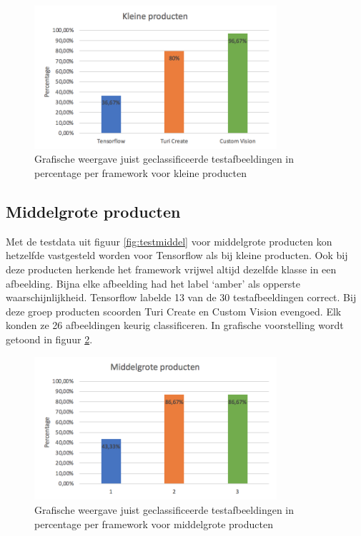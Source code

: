 \begin{figure}[ht!]
  \centering
      \includegraphics[width=0.8\textwidth]{img/grafiekkleineproducten.png}
  \caption{Grafische weergave juist geclassificeerde testafbeeldingen in percentage per framework voor kleine producten}
  \label{fig:grafiekkleineproducten}
\end{figure}

\subsection{Middelgrote producten}
\label{ssec:Middelgrote producten}

Met de testdata uit figuur \ref{fig:testmiddel} voor middelgrote producten kon hetzelfde vastgesteld worden voor Tensorflow als bij kleine producten.  Ook bij deze producten herkende het framework vrijwel altijd dezelfde klasse in een afbeelding. Bijna elke afbeelding had het label ‘amber’ als opperste waarschijnlijkheid. Tensorflow labelde 13 van de 30 testafbeeldingen correct. Bij deze groep producten scoorden Turi Create en Custom Vision evengoed. Elk konden ze 26 afbeeldingen keurig classificeren.  In grafische voorstelling wordt getoond in figuur \ref{fig:grafiekmiddelproducten}.

\begin{figure}[ht!]
  \centering
      \includegraphics[width=0.8\textwidth]{img/grafiekmiddelproducten.png}
  \caption{Grafische weergave juist geclassificeerde testafbeeldingen in percentage per framework voor middelgrote producten}
  \label{fig:grafiekmiddelproducten}
\end{figure}

